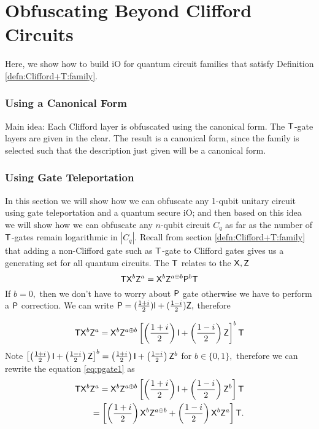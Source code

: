 \section{Obfuscating Beyond Clifford Circuits}
Here, we show how to build iO for quantum circuit families that satisfy Definition \ref{defn:Clifford+T:family}.

\subsubsection{Using a Canonical Form}
Main idea: Each Clifford layer is obfuscated using the canonical form. The ${\sf T}$-gate layers are given in the clear. The result is a canonical form, since the family is selected such that the description just given will be a canonical form.


\subsubsection{Using Gate Teleportation}
In this section we will show how we can obfuscate any 1-qubit unitary circuit using gate teleportation and a quantum secure iO; and then based on this idea we will show how we can obfuscate any $n$-qubit circuit $C_q$ as far as the number of ${\sf T}$-gates remain logarithmic in $|C_q|.$ Recall from  section \ref{defn:Clifford+T:family} that adding a non-Clifford gate  such as ${\sf T}$-gate to Clifford gates gives us a generating set for all quantum circuits. The ${\sf T}$ relates to the ${\sf X}, {\sf Z}$
$${\sf T} {\sf X}^b {\sf Z}^a={\sf X}^b {\sf Z}^{a\oplus b}{\sf P}^b {\sf T}$$
If $b=0,$ then we don't have to worry about ${\sf P}$ gate otherwise we have to perform a ${\sf P}$ correction. We can write ${\sf P}=(\frac{1+i}{2}) {\sf I} + (\frac{1-i}{2}){\sf Z},$ therefore

\begin{equation}
\label{eq:pgate1}
{\sf T} {\sf X}^b {\sf Z}^a={\sf X}^b {\sf Z}^{a\oplus b}\left[\left(\frac{1+i}{2}\right) {\sf I} + \left(\frac{1-i}{2}\right){\sf Z}\right]^b {\sf T}
\end{equation}
Note  $\left[\left(\frac{1+i}{2}\right) {\sf I} + \left(\frac{1-i}{2}\right){\sf Z}\right]^b=\left(\frac{1+i}{2}\right) {\sf I} + \left(\frac{1-i}{2}\right){\sf Z}^b$ for $b \in \{0,1\},$ therefore we can rewrite the equation \ref{eq:pgate1} as
\begin{equation}
\label{eq:pgate2}
\begin{aligned}
{\sf T} {\sf X}^b {\sf Z}^a={\sf X}^b {\sf Z}^{a\oplus b}\left[\left(\frac{1+i}{2}\right) {\sf I} + \left(\frac{1-i}{2}\right){\sf Z}^b\right] {\sf T} \\
=\left[\left(\frac{1+i}{2}\right) {\sf X}^b {\sf Z}^{a\oplus b} + \left(\frac{1-i}{2}\right){\sf X}^b {\sf Z}^a\right] {\sf T}. \\
\end{aligned}
\end{equation}

